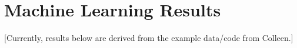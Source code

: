 \section{Machine Learning Results}

[Currently, results below are derived from the example data/code from Colleen.]